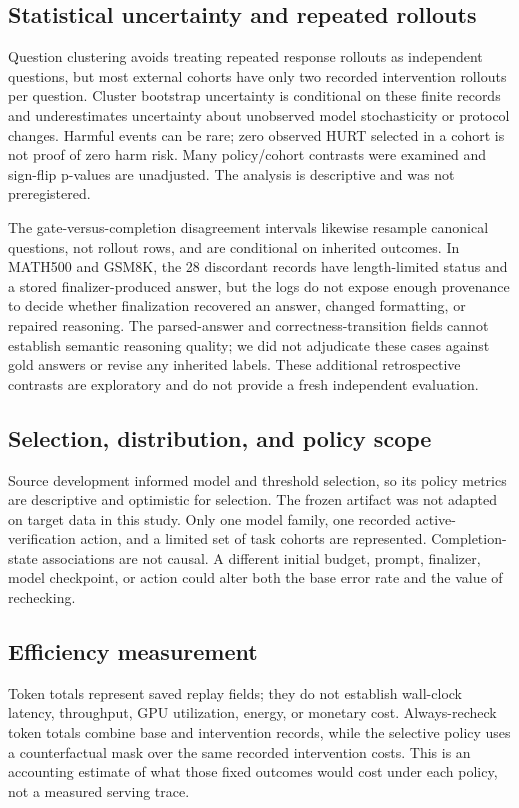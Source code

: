 \documentclass[conference]{IEEEtran}
\begin{document}
\subsection{Statistical uncertainty and repeated rollouts}
Question clustering avoids treating repeated response rollouts as independent questions, but most external cohorts have only two recorded intervention rollouts per question. Cluster bootstrap uncertainty is conditional on these finite records and underestimates uncertainty about unobserved model stochasticity or protocol changes. Harmful events can be rare; zero observed HURT selected in a cohort is not proof of zero harm risk. Many policy/cohort contrasts were examined and sign-flip p-values are unadjusted. The analysis is descriptive and was not preregistered.

The gate-versus-completion disagreement intervals likewise resample canonical questions, not rollout rows, and are conditional on inherited outcomes. In MATH500 and GSM8K, the 28 discordant records have length-limited status and a stored finalizer-produced answer, but the logs do not expose enough provenance to decide whether finalization recovered an answer, changed formatting, or repaired reasoning. The parsed-answer and correctness-transition fields cannot establish semantic reasoning quality; we did not adjudicate these cases against gold answers or revise any inherited labels. These additional retrospective contrasts are exploratory and do not provide a fresh independent evaluation.

\subsection{Selection, distribution, and policy scope}
Source development informed model and threshold selection, so its policy metrics are descriptive and optimistic for selection. The frozen artifact was not adapted on target data in this study. Only one model family, one recorded active-verification action, and a limited set of task cohorts are represented. Completion-state associations are not causal. A different initial budget, prompt, finalizer, model checkpoint, or action could alter both the base error rate and the value of rechecking.

\subsection{Efficiency measurement}
Token totals represent saved replay fields; they do not establish wall-clock latency, throughput, GPU utilization, energy, or monetary cost. Always-recheck token totals combine base and intervention records, while the selective policy uses a counterfactual mask over the same recorded intervention costs. This is an accounting estimate of what those fixed outcomes would cost under each policy, not a measured serving trace.
\end{document}
